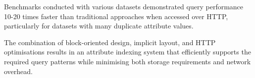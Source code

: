 Benchmarks conducted with various datasets demonstrated query performance 10-20 times faster than traditional approaches when accessed over HTTP, particularly for datasets with many duplicate attribute values.

The combination of block-oriented design, implicit layout, and HTTP optimisations results in an attribute indexing system that efficiently supports the required query patterns while minimising both storage requirements and network overhead.
